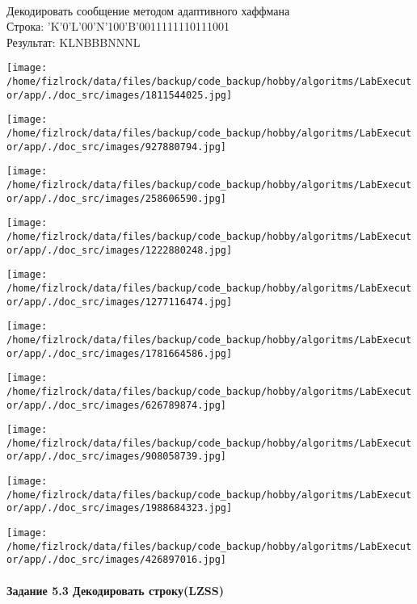 \documentclass[a4paper, 12pt]{article}
\begin{document}
\\ 

Декодировать сообщение методом адаптивного хаффмана \\
Строка: 
'K'0'L'00'N'100'B'0011111110111001\\
Результат: KLNBBBNNNL

\texttt{[image: /home/fizlrock/data/files/backup/code\_backup/hobby/algoritms/LabExecutor/app/./doc\_src/images/1811544025.jpg]}

\texttt{[image: /home/fizlrock/data/files/backup/code\_backup/hobby/algoritms/LabExecutor/app/./doc\_src/images/927880794.jpg]}

\texttt{[image: /home/fizlrock/data/files/backup/code\_backup/hobby/algoritms/LabExecutor/app/./doc\_src/images/258606590.jpg]}

\texttt{[image: /home/fizlrock/data/files/backup/code\_backup/hobby/algoritms/LabExecutor/app/./doc\_src/images/1222880248.jpg]}

\texttt{[image: /home/fizlrock/data/files/backup/code\_backup/hobby/algoritms/LabExecutor/app/./doc\_src/images/1277116474.jpg]}

\texttt{[image: /home/fizlrock/data/files/backup/code\_backup/hobby/algoritms/LabExecutor/app/./doc\_src/images/1781664586.jpg]}

\texttt{[image: /home/fizlrock/data/files/backup/code\_backup/hobby/algoritms/LabExecutor/app/./doc\_src/images/626789874.jpg]}

\texttt{[image: /home/fizlrock/data/files/backup/code\_backup/hobby/algoritms/LabExecutor/app/./doc\_src/images/908058739.jpg]}

\texttt{[image: /home/fizlrock/data/files/backup/code\_backup/hobby/algoritms/LabExecutor/app/./doc\_src/images/1988684323.jpg]}

\texttt{[image: /home/fizlrock/data/files/backup/code\_backup/hobby/algoritms/LabExecutor/app/./doc\_src/images/426897016.jpg]}
\pagebreak
\paragraph{Задание 5.3 Декодировать строку(LZSS)\\}
\end{document}

